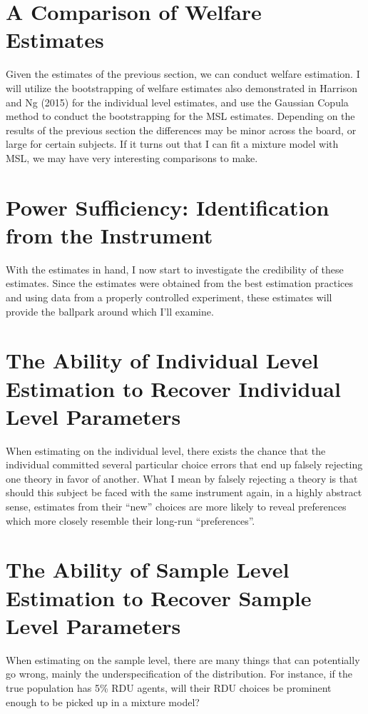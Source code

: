 \documentclass[../main.tex]{subfiles}
\begin{document}
\section{A Comparison of Welfare Estimates}

Given the estimates of the previous section, we can conduct welfare estimation.
I will utilize the bootstrapping of welfare estimates also demonstrated in Harrison and Ng (2015) for the individual level estimates, and use the Gaussian Copula method to conduct the bootstrapping for the MSL estimates.
Depending on the results of the previous section the differences may be minor across the board, or large for certain subjects.
If it turns out that I can fit a mixture model with MSL, we may have very interesting comparisons to make.

\section{Power Sufficiency: Identification from the Instrument}

With the estimates in hand, I now start to investigate the credibility of these estimates.
Since the estimates were obtained from the best estimation practices and using data from a  properly controlled experiment, these estimates will provide the ballpark around which I'll examine.

\section{The Ability of Individual Level Estimation to Recover Individual Level Parameters}

When estimating on the individual level, there exists the chance that the individual committed several particular choice errors that end up falsely rejecting one theory in favor of another.
What I mean by falsely rejecting a theory is that should this subject be faced with the same instrument again, in a highly abstract sense, estimates from their \enquote{new} choices are more likely to reveal preferences which more closely resemble their long-run \enquote{preferences}.

\section{The Ability of Sample Level Estimation to Recover Sample Level Parameters}

When estimating on the sample level, there are many things that can potentially go wrong, mainly the underspecification of the distribution.
For instance, if the true population has 5\% RDU agents, will their RDU choices be prominent enough to be picked up in a mixture model?

\newpage

\printbibliography[segment=4, heading=subbibliography]
\end{document}
